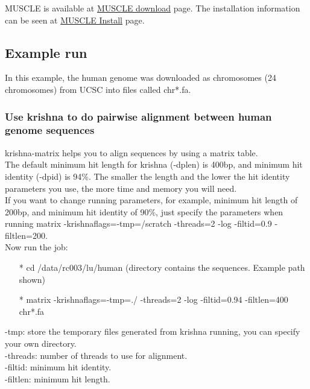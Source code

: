 \documentclass[12pt]{article}
\begin{document}
\noindent MUSCLE is available at \href{https://www.drive5.com/muscle/downloads.htm} {\color{blue}MUSCLE download} page.
\noindent The installation information can be seen at \href{https://www.drive5.com/muscle/manual/install.html} {\color{blue}MUSCLE Install} page.


\subsection{Example run}
In this example, the human genome was downloaded as chromosomes (24 chromosomes) from UCSC into files called chr*.fa.

\subsubsection{Use krishna to do pairwise alignment between human genome sequences}

krishna-matrix helps you to align sequences by using a matrix table. \\

\noindent The default minimum hit length for krishna (-dplen) is 400bp, and minimum hit identity (-dpid) is 94\%. The smaller the length and the lower the hit identity parameters you use, the more time and memory you will need. \\

\noindent If you want to change running parameters, for example, minimum hit length of 200bp, and minimum hit identity of 90\%, just specify the parameters when running matrix {\color{red}-krishnaflags=\textquotedbl-tmp=/scratch -threads=2 -log -filtid=0.9 -filtlen=200\textquotedbl}.\\

\noindent Now run the job:

\begin{enumerate}
	\item[*] cd /data/rc003/lu/human (directory contains the sequences. Example path shown)
	\item[*] matrix -krishnaflags=\textquotedbl-tmp=./ -threads=2 -log -filtid=0.94 -filtlen=400\textquotedbl{} chr*.fa
\end{enumerate}
-tmp: store the temporary files generated from krishna running, you can specify your own directory. \\
-threads:  number of threads to use for alignment. \\
-filtid: minimum hit identity. \\
-filtlen: minimum hit length. \\
\end{document}
